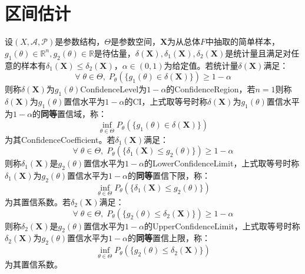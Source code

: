 \section{区间估计}

\begin{definition}
	设$(X,\mathscr{A},\mathscr{P})$是参数结构，$\Theta$是参数空间，$\mathbf{X}$为从总体$F$中抽取的简单样本，$g_1(\theta)\in\mathbb{R}^{n},g_2(\theta)\in\mathbb{R}$是待估量，$\delta(\mathbf{X}),\delta_1(\mathbf{X}),\delta_2(\mathbf{X})$是统计量且满足对任意的样本有$\delta_1(\mathbf{X})\leqslant\delta_2(\mathbf{X})$，$\alpha\in(0,1)$为给定值。若统计量$\delta(\mathbf{X})$满足：
	\begin{equation*}
		\forall\;\theta\in\Theta,\;P_{\theta}(\{g_1(\theta)\in \delta(\mathbf{X})\})\geqslant 1-\alpha
	\end{equation*}
	则称$\delta(\mathbf{X})$为$g_1(\theta)$\gls{ConfidenceLevel}为$1-\alpha$的\gls{ConfidenceRegion}，若$n=1$则称$\delta(\mathbf{X})$为$g_1(\theta)$置信水平为$1-\alpha$的\gls{CI}，上式取等号时称$\delta(\mathbf{X})$为$g_1(\theta)$置信水平为$1-\alpha$的\textbf{同等}置信域，称：
	\begin{equation*}
		\inf_{\theta\in\Theta}P_{\theta}(\{g_1(\theta)\in\delta(\mathbf{X})\})
	\end{equation*}
	为其\gls{ConfidenceCoefficient}。若$\delta_1(\mathbf{X})$满足：
	\begin{equation*}
		\forall\;\theta\in\Theta,\;P_{\theta}(\{\delta_1(\mathbf{X})\leqslant g_2(\theta)\})\geqslant 1-\alpha
	\end{equation*}	
	则称$\delta_1(\mathbf{X})$是$g_2(\theta)$置信水平为$1-\alpha$的\gls{LowerConfidenceLimit}，上式取等号时称$\delta_1(\mathbf{X})$为$g_2(\theta)$置信水平为$1-\alpha$的\textbf{同等}置信下限，称：
	\begin{equation*}
		\inf_{\theta\in\Theta}P_{\theta}(\{\delta_1(\mathbf{X})\leqslant g_2(\theta)\})
	\end{equation*}
	为其置信系数。若$\delta_2(\mathbf{X})$满足：
	\begin{equation*}
		\forall\;\theta\in\Theta,\;P_{\theta}(\{g_2(\theta)\leqslant\delta_2(\mathbf{X})\})\geqslant 1-\alpha
	\end{equation*}	
	则称$\delta_2(\mathbf{X})$是$g_2(\theta)$置信水平为$1-\alpha$的\gls{UpperConfidenceLimit}，上式取等号时称$\delta_2(\mathbf{X})$为$g_2(\theta)$置信水平为$1-\alpha$的\textbf{同等}置信上限，称：
	\begin{equation*}
		\inf_{\theta\in\Theta}P_{\theta}(\{g_2(\theta)\leqslant\delta_2(\mathbf{X})\})
	\end{equation*}
	为其置信系数。
\end{definition}
